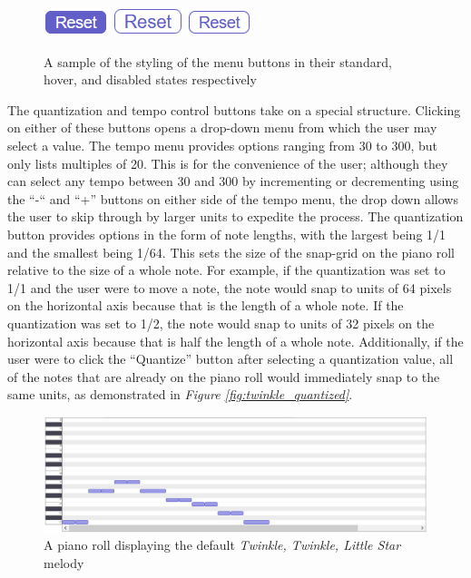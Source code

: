 \begin{figure}[h!]
  \centering
  \includegraphics{image/StdUI.png}
  \includegraphics{image/HoverUI.png}
  \includegraphics{image/DisabledUI.png}
  \caption{A sample of the styling of the menu buttons in their standard, hover, and disabled states respectively}
  \label{fig:ui_variations}
\end{figure}

The quantization and tempo control buttons take on a special structure. Clicking on either of
these buttons opens a drop-down menu from which the user may select a value. The tempo menu
provides options ranging from 30 to 300, but only lists multiples of 20. This is for the
convenience of the user; although they can select any tempo between 30 and 300 by incrementing or
decrementing using the “-“ and “+” buttons on either side of the tempo menu, the drop down allows
the user to skip through by larger units to expedite the process. The quantization button provides
options in the form of note lengths, with the largest being 1/1 and the smallest being 1/64. This
sets the size of the snap-grid on the piano roll relative to the size of a whole note. For example,
if the quantization was set to 1/1 and the user were to move a note, the note would snap to units
of 64 pixels on the horizontal axis because that is the length of a whole note. If the quantization
was set to 1/2, the note would snap to units of 32 pixels on the horizontal axis because that is
half the length of a whole note. Additionally, if the user were to click the “Quantize” button
after selecting a quantization value, all of the notes that are already on the piano roll would
immediately snap to the same units, as demonstrated in \textit{Figure \ref{fig:twinkle_quantized}}.

\begin{figure}[h!]
  \centering
  \includegraphics[width=\linewidth]{image/TwinkleOriginal.png}
  \caption{A piano roll displaying the default \textit{Twinkle, Twinkle, Little Star} melody}
  \label{fig:twinkle_original}
\end{figure}


